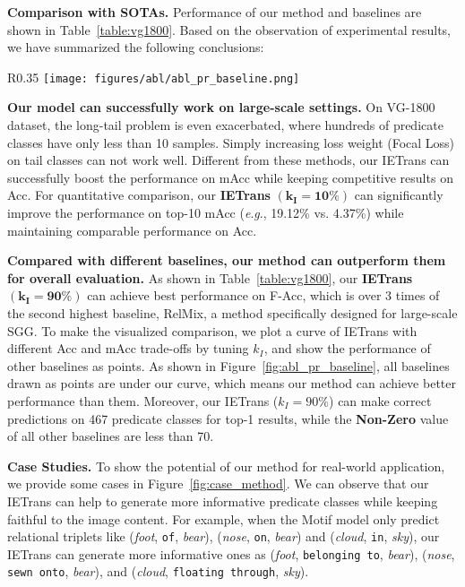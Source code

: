 \documentclass[runningheads]{llncs}
\newcommand{\eg}{\textit{e}.\textit{g}.}
\begin{document}
\smallskip
\noindent
\textbf{Comparison with SOTAs.}
Performance of our method and baselines are shown in Table~\ref{table:vg1800}.
Based on the observation of experimental results, we have summarized the following conclusions:

\begin{wrapfigure}{R}{0.35\textwidth}
\centering
        \texttt{[image: figures/abl/abl\_pr\_baseline.png]}
        \caption{The mAcc and Acc curve. (a) is our IETrans method. $k_I$ is tuned to generate the blue curve. (b-f) are baselines.}
        \label{fig:abl_pr_baseline}
\end{wrapfigure}

\textbf{Our model can successfully work on large-scale settings.}
On VG-1800 dataset, the long-tail problem is even exacerbated, where hundreds of predicate classes have only less than 10 samples.
Simply increasing loss weight (Focal Loss) on tail classes can not work well.
Different from these methods, our IETrans can successfully boost the performance on mAcc while keeping competitive results on Acc.
For quantitative comparison, our \textbf{IETrans} $\boldsymbol{(k_I=10\%)}$ can significantly improve the performance on top-10 mAcc (\eg, 19.12\% vs. 4.37\%) while maintaining comparable performance on Acc.


\textbf{Compared with different baselines, our method can outperform them for overall evaluation.}
As shown in Table~\ref{table:vg1800}, our \textbf{IETrans} $\boldsymbol{(k_I=90\%)}$ can achieve best performance on F-Acc, which is over 3 times of the second highest baseline, RelMix, a method specifically designed for large-scale SGG.
To make the visualized comparison, we plot a curve of IETrans with different Acc and mAcc trade-offs by tuning $k_I$, and show the performance of other baselines as points.
As shown in Figure~\ref{fig:abl_pr_baseline}, all baselines drawn as points are under our curve, which means our method can achieve better performance than them.
Moreover, our IETrans ($k_I=90\%$) can make correct predictions on 467 predicate classes for top-1 results, while the \textbf{Non-Zero} value of all other baselines are less than 70. 


\smallskip
\noindent
\textbf{Case Studies.}
To show the potential of our method for real-world application, we provide some cases in Figure~\ref{fig:case_method}.
We can observe that our IETrans can help to generate more informative predicate classes while keeping faithful to the image content.
For example, when the Motif model only predict relational triplets like (\textit{foot}, \texttt{of}, \textit{bear}), (\textit{nose}, \texttt{on}, \textit{bear}) and (\textit{cloud}, \texttt{in}, \textit{sky}), our IETrans can generate more informative ones as (\textit{foot}, \texttt{belonging to}, \textit{bear}), (\textit{nose}, \texttt{sewn onto}, \textit{bear}), and (\textit{cloud}, \texttt{floating through}, \textit{sky}).
\end{document}
